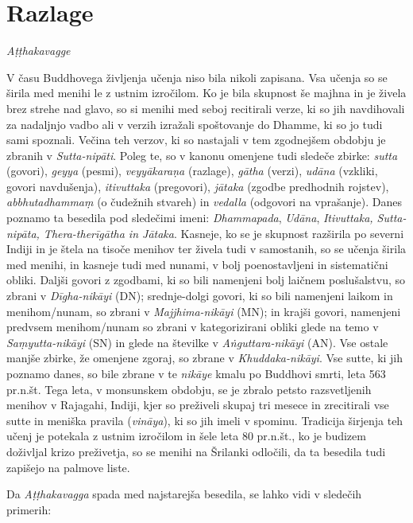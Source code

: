 
\chapter{Razlage}

\emph{Aṭṭhakavagge}

V času Buddhovega življenja učenja niso bila nikoli zapisana. Vsa učenja
so se širila med menihi le z ustnim izročilom. Ko je bila skupnost še
majhna in je živela brez strehe nad glavo, so si menihi med seboj
recitirali verze, ki so jih navdihovali za nadaljnjo vadbo ali v verzih
izražali spoštovanje do Dhamme, ki so jo tudi sami spoznali. Večina teh
verzov, ki so nastajali v tem zgodnejšem obdobju je zbranih v
\emph{Sutta-nipāti}. Poleg te, so v kanonu omenjene tudi sledeče zbirke:
\emph{sutta} (govori), \emph{geyya} (pesmi), \emph{veyyākaraṇa}
(razlage), \emph{gātha} (verzi), \emph{udāna} (vzkliki, govori
navdušenja), \emph{itivuttaka} (pregovori), \emph{jātaka} (zgodbe
predhodnih rojstev), \emph{abbhutadhammaṃ} (o čudežnih stvareh) in
\emph{vedalla} (odgovori na vprašanje). Danes poznamo ta besedila pod
sledečimi imeni: \emph{Dhammapada}, \emph{Udāna}, \emph{Itivuttaka,
Sutta-nipāta, Thera-therīgātha in Jātaka}. Kasneje, ko se je skupnost
razširila po severni Indiji in je štela na tisoče menihov ter živela
tudi v samostanih, so se učenja širila med menihi, in kasneje tudi med
nunami, v bolj poenostavljeni in sistematični obliki. Daljši govori z
zgodbami, ki so bili namenjeni bolj laičnem poslušalstvu, so zbrani v
\emph{Dīgha-nikāyi} (DN); srednje-dolgi govori, ki so bili namenjeni
laikom in menihom/nunam, so zbrani v \emph{Majjhima-nikāyi} (MN); in
krajši govori, namenjeni predvsem menihom/nunam so zbrani v
kategorizirani obliki glede na temo v \emph{Saṃyutta-nikāyi} (SN) in
glede na številke v \emph{Aṅguttara-nikāyi} (AN). Vse ostale manjše
zbirke, že omenjene zgoraj, so zbrane v \emph{Khuddaka-nikāyi}. Vse
sutte, ki jih poznamo danes, so bile zbrane v te \emph{nikāye} kmalu po
Buddhovi smrti, leta 563 pr.n.št. Tega leta, v monsunskem obdobju, se je
zbralo petsto razsvetljenih menihov v Rajagahi, Indiji, kjer so
preživeli skupaj tri mesece in zrecitirali vse sutte in meniška pravila
(\emph{vināya}), ki so jih imeli v spominu. Tradicija širjenja teh učenj
je potekala z ustnim izročilom in šele leta 80 pr.n.št., ko je budizem
doživljal krizo preživetja, so se menihi na Šrilanki odločili, da ta
besedila tudi zapišejo na palmove liste.

Da \emph{Aṭṭhakavagga} spada med najstarejša besedila, se lahko vidi v
sledečih primerih:

